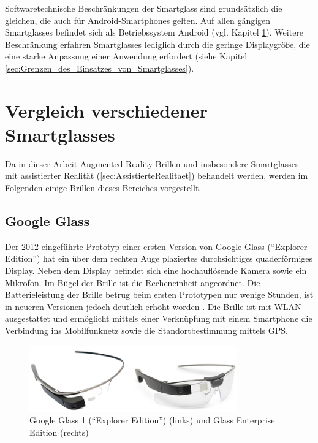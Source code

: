 Softwaretechnische Beschränkungen der Smartglass sind grundsätzlich die gleichen, die auch für Android-Smartphones gelten. Auf allen gängigen Smartglasses befindet sich als Betriebssystem Android (vgl. Kapitel \ref{sec:VergleichSmartglasses}). Weitere Beschränkung erfahren Smartglasses lediglich durch die geringe Displaygröße, die eine starke Anpassung einer Anwendung erfordert (siehe Kapitel \ref{sec:Grenzen_des_Einsatzes_von_Smartglasses}).
%
%
%
%
%
%
\section{Vergleich verschiedener Smartglasses}
\label{sec:VergleichSmartglasses}
Da in dieser Arbeit Augmented Reality-Brillen und insbesondere Smartglasses mit assistierter Realität (\ref{sec:AssistierteRealitaet}) behandelt werden, werden im Folgenden einige Brillen dieses Bereiches vorgestellt.
%
%
%
%
%
%
\subsection{Google Glass}
\label{sec:Google_Glass}
Der 2012 eingeführte Prototyp einer ersten Version von Google Glass (\enquote{Explorer Edition}) hat ein über dem rechten Auge plaziertes durchsichtiges quaderförmiges Display. Neben dem Display befindet sich eine hochauflösende Kamera sowie ein Mikrofon. Im Bügel der Brille ist die Recheneinheit angeordnet. Die Batterieleistung der Brille betrug beim ersten Prototypen nur wenige Stunden, ist in neueren Versionen jedoch deutlich erhöht worden \cite{Inc.2018}. Die Brille ist mit WLAN ausgestattet und ermöglicht mittels einer Verknüpfung mit einem Smartphone die Verbindung ins Mobilfunknetz sowie die Standortbestimmung mittels GPS.
%
\begin{figure}[htbp]
    \centering
    \includegraphics[width=0.8\textwidth]{data/bilder/Glass_1_und_2.png}
    \caption{Google Glass 1 (\enquote{Explorer Edition}) \cite{Reckmann2014a} (links) und Glass Enterprise Edition \cite{Huvelin2017} (rechts)}
    \label{fig:GlassModel}
\end{figure}
%

